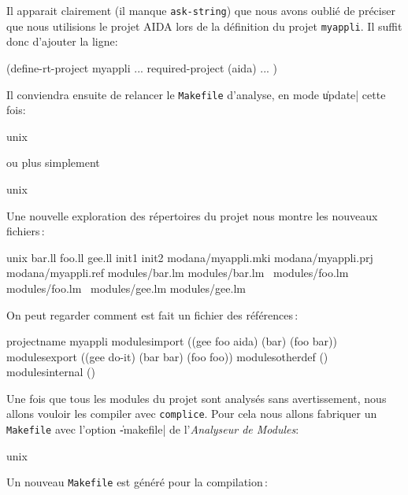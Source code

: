 Il apparait clairement (il manque {\tt ask-string})
que nous avons oubli\'{e} de pr\'{e}ciser que nous
utilisions le projet AIDA lors de la d\'{e}finition du projet {\tt myappli}.
Il suffit donc d'ajouter la ligne:
\begin{Longcode*}
(define-rt-project myappli
         ...
        required-project (aida)
         ...
)
\end{Longcode*}
Il conviendra ensuite de relancer le {\tt Makefile} d'analyse, en mode
\|update| cette fois:
\begin{Longcode*}
unix%
\end{Longcode*}
ou plus simplement
\begin{Longcode*}
unix%
\end{Longcode*}
Une nouvelle exploration des r\'{e}pertoires du projet nous montre les
nouveaux fichiers\,:
\begin{Longcode*}
unix%
bar.ll
foo.ll
gee.ll
init1
init2
modana/myappli.mki
modana/myappli.prj
modana/myappli.ref
modules/bar.lm
modules/bar.lm~
modules/foo.lm
modules/foo.lm~
modules/gee.lm
modules/gee.lm~
\end{Longcode*}

On peut regarder comment est fait un fichier des r\'{e}f\'{e}rences\,:


\begin{Longcode*}
projectname
myappli
modulesimport
((gee foo aida) (bar) (foo bar))
modulesexport
((gee do-it) (bar bar) (foo foo))
modulesotherdef
()
modulesinternal
()
\end{Longcode*}


Une fois que tous les modules du projet sont analys\'{e}s sans
avertissement, nous allons vouloir les compiler avec {\tt complice}.
Pour cela nous allons fabriquer un {\tt Makefile} avec l'option \|-makefile|
de l'{\em Analyseur de Modules}:
\begin{Longcode*}
unix%
\end{Longcode*}
Un nouveau {\tt Makefile} est g\'{e}n\'{e}r\'{e} pour la compilation\,:

